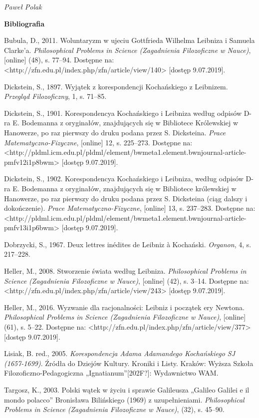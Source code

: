 \documentclass[a4paper]{article}
\begin{document}
{\raggedleft\itshape
Paweł Polak
\par}

{\bfseries
Bibliografia}

Bubula, D., 2011. Woluntaryzm w ujeciu Gottfrieda Wilhelma Leibniza i Samuela Clarke’a. \textit{Philosophical Problems
in Science (Zagadnienia Filozoficzne w Nauce)}, [online] (48), s. 77–94. Dostępne na:
{\textless}http://zfn.edu.pl/index.php/zfn/article/view/140{\textgreater} [dostęp 9.07.2019].

Dickstein, S., 1897. Wyjątek z korespondencji Kochańskiego z Leibnizem. \textit{Przegląd Filozoficzny}, 1, s. 71–85.

Dickstein, S., 1901. Korespondencya Kochańskiego i Leibniza według odpisów D-ra E. Bodemanna z oryginałów, znajdujących
się w Bibliotece Królewskiej w Hanowerze, po raz pierwszy do druku podana przez S. Dicksteina. \textit{Prace
Matematyczno-Fizyczne}, [online] 12, s. 225–273. Dostępne na:
{\textless}http://pldml.icm.edu.pl/pldml/element/bwmeta1.element.bwnjournal-article-pmfv12i1p8bwm{\textgreater} [dostęp
9.07.2019].

Dickstein, S., 1902. Korespondencya Kochańskiego i Leibniza, według odpisów D-ra E. Bodemanna z oryginałów, znajdujących
się w Bibliotece królewskiej w Hanowerze, po raz pierwszy do druku podana przez S. Dicksteina (ciąg dalszy i
dokończenie). \textit{Prace Matematyczno-Fizyczne}, [online] 13, s. 237–283. Dostępne na:
{\textless}http://pldml.icm.edu.pl/pldml/element/bwmeta1.element.bwnjournal-article-pmfv13i1p6bwm{\textgreater} [dostęp
9.07.2019].

Dobrzycki, S., 1967. Deux lettres inédites de Leibniz à Kochański. \textit{Organon}, 4, s. 217–228.

Heller, M., 2008. Stworzenie świata według Leibniza. \textit{Philosophical Problems in Science (Zagadnienia Filozoficzne
w Nauce)}, [online] (42), s. 3–14. Dostępne na:
{\textless}http://zfn.edu.pl/index.php/zfn/article/view/243{\textgreater} [dostęp 9.07.2019].

Heller, M., 2016. Wyzwanie dla racjonalności: Leibniz i początek ery Newtona. \textit{Philosophical Problems in Science
(Zagadnienia Filozoficzne w Nauce)}, [online] (61), s. 5–22. Dostępne na:
{\textless}http://zfn.edu.pl/index.php/zfn/article/view/377{\textgreater} [dostęp 9.07.2019].

Lisiak, B. red., 2005. \textit{Korespondencja Adama Adamandego Kochańskiego SJ (1657-1699)}. Źródła do Dziejów Kultury.
Kroniki i Listy. Kraków: Wyższa Szkoła Filozoficzno-Pedagogiczna „Ignatianum”[202F?]: Wydawnictwo WAM.

Targosz, K., 2003. Polski wątek w życiu i sprawie Galileusza „Galileo Galilei e il mondo polacco” Bronisława Bilińskiego
(1969) z uzupełnieniami. \textit{Philosophical Problems in Science (Zagadnienia Filozoficzne w Nauce)}, (32), s. 45–90.
\end{document}
